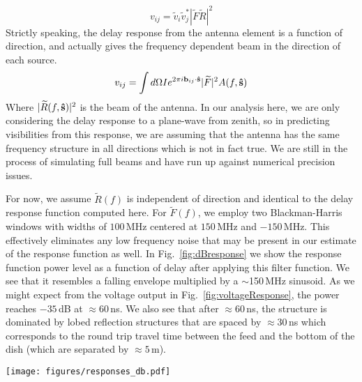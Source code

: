 \documentclass[useAMS,usenatbib]{mn2e}
\begin{document}
\begin{equation}\label{eq:vis}
v_{ij} = \widetilde{v}_i \widetilde{v}_j^* |\widetilde{F} \widetilde{R}|^2
\end{equation}
Strictly speaking, the delay response from the antenna element is a function of direction, and actually gives the frequency dependent beam in the direction of each source. 
\begin{equation}
v_{ij} = \int d \Omega I e^{2 \pi i {\bf b}_{ij} \cdot {\bf \hat{s}} } |\widetilde{F}|^2 A(f,{\bf \hat{s}})
\end{equation}
Where $|\widetilde{R}(f,{\bf \hat{s}})|^2$ is the beam of the antenna. In our analysis here, we are only considering the delay response to a plane-wave from zenith, so in predicting visibilities from this response, we are assuming that the antenna has the same frequency structure in all directions which is not in fact true. We are still in the process of simulating full beams and have run up against numerical precision issues.


For now, we assume $\widetilde{R}(f)$ is independent of direction and identical to the delay response function computed here. For $\widetilde{F}(f)$, we employ two Blackman-Harris windows with widths of $100$\,MHz centered at $150$\,MHz and $-150$\,MHz. This effectively eliminates any low frequency noise that may be present in our estimate of the response function as well. In Fig.~\ref{fig:dBresponse} we show the response function power level as a function of delay after applying this filter function. We see that it resembles a falling envelope multiplied by a $\sim$150\,MHz sinusoid. As we might expect from the voltage output in Fig.~\ref{fig:voltageResponse}, the power reaches $-35$\,dB at $\approx 60$\,ns. We also see that after $\approx 60$\,ns, the structure is dominated by lobed reflection structures that are spaced by $\approx 30$\,ns which corresponds to the round trip travel time between the feed and the bottom of the dish (which are separated by $\approx 5$\,m). 



\begin{figure*}
\texttt{[image: figures/responses\_db.pdf]}
\caption{The time-domain power response function of the PAPER feed with a 100 MHz blackman Harris window centered at 150 MHz applied. The response functions have been shifted $\approx 30$\,ns to the left to account for the initial propogation time for the input wave packet to arrive at the feed. We have drawn a dashed black line at 60\,ns to ephasize the HERA spec of -60dB at 60\,ns. We find ourselves at $\approx -35$\,dB at 60\,ns.}
\label{fig:dBresponse}
\end{figure*}
\end{document}

